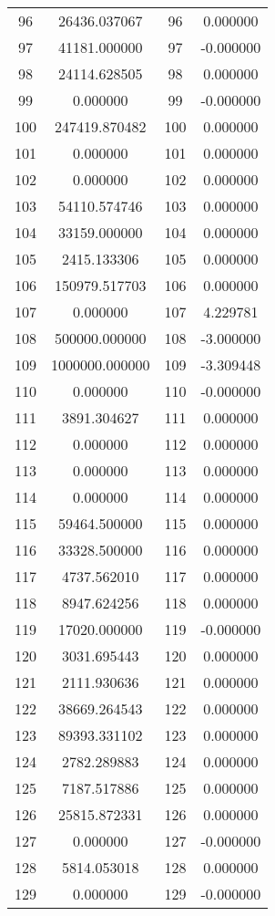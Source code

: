 \documentclass[12pt]{article}
\begin{document}
\begin{longtable}{@{}cccc@{}}
96 & 26436.037067 & 96 & 0.000000 \\
97 & 41181.000000 & 97 & -0.000000 \\
98 & 24114.628505 & 98 & 0.000000 \\
99 & 0.000000 & 99 & -0.000000 \\
100 & 247419.870482 & 100 & 0.000000 \\
101 & 0.000000 & 101 & 0.000000 \\
102 & 0.000000 & 102 & 0.000000 \\
103 & 54110.574746 & 103 & 0.000000 \\
104 & 33159.000000 & 104 & 0.000000 \\
105 & 2415.133306 & 105 & 0.000000 \\
106 & 150979.517703 & 106 & 0.000000 \\
107 & 0.000000 & 107 & 4.229781 \\
108 & 500000.000000 & 108 & -3.000000 \\
109 & 1000000.000000 & 109 & -3.309448 \\
110 & 0.000000 & 110 & -0.000000 \\
111 & 3891.304627 & 111 & 0.000000 \\
112 & 0.000000 & 112 & 0.000000 \\
113 & 0.000000 & 113 & 0.000000 \\
114 & 0.000000 & 114 & 0.000000 \\
115 & 59464.500000 & 115 & 0.000000 \\
116 & 33328.500000 & 116 & 0.000000 \\
117 & 4737.562010 & 117 & 0.000000 \\
118 & 8947.624256 & 118 & 0.000000 \\
119 & 17020.000000 & 119 & -0.000000 \\
120 & 3031.695443 & 120 & 0.000000 \\
121 & 2111.930636 & 121 & 0.000000 \\
122 & 38669.264543 & 122 & 0.000000 \\
123 & 89393.331102 & 123 & 0.000000 \\
124 & 2782.289883 & 124 & 0.000000 \\
125 & 7187.517886 & 125 & 0.000000 \\
126 & 25815.872331 & 126 & 0.000000 \\
127 & 0.000000 & 127 & -0.000000 \\
128 & 5814.053018 & 128 & 0.000000 \\
129 & 0.000000 & 129 & -0.000000 \\

\end{longtable}
\end{document}
